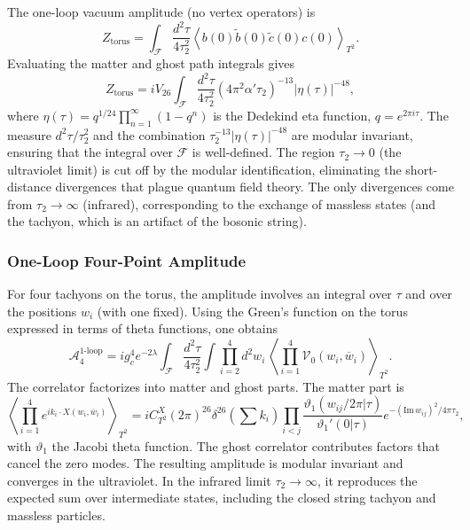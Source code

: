\documentclass[11pt]{article}
\renewcommand{\tilde}{\widetilde}
\renewcommand{\bar}{\overline}
\begin{document}
The one-loop vacuum amplitude (no vertex operators) is
\begin{equation}
Z_{\text{torus}} = \int_{\mathcal{F}} \frac{d^2\tau}{4\tau_2^2} \left\langle b(0)\tilde{b}(0)\tilde{c}(0)c(0) \right\rangle_{T^2}.
\end{equation}
Evaluating the matter and ghost path integrals gives
\begin{equation}
Z_{\text{torus}} = i V_{26} \int_{\mathcal{F}} \frac{d^2\tau}{4\tau_2^2} (4\pi^2\alpha'\tau_2)^{-13} |\eta(\tau)|^{-48},
\end{equation}
where $\eta(\tau)=q^{1/24}\prod_{n=1}^\infty (1-q^n)$ is the Dedekind eta function, $q=e^{2\pi i\tau}$. The measure $d^2\tau/\tau_2^2$ and the combination $\tau_2^{-13}|\eta(\tau)|^{-48}$ are modular invariant, ensuring that the integral over $\mathcal{F}$ is well-defined. The region $\tau_2 \to 0$ (the ultraviolet limit) is cut off by the modular identification, eliminating the short-distance divergences that plague quantum field theory. The only divergences come from $\tau_2 \to \infty$ (infrared), corresponding to the exchange of massless states (and the tachyon, which is an artifact of the bosonic string).

\subsubsection{One-Loop Four-Point Amplitude}

For four tachyons on the torus, the amplitude involves an integral over $\tau$ and over the positions $w_i$ (with one fixed). Using the Green's function on the torus expressed in terms of theta functions, one obtains
\begin{equation}
\mathcal{A}_4^{\text{1-loop}} = i g_c^4 e^{-2\lambda} \int_{\mathcal{F}} \frac{d^2\tau}{4\tau_2^2} \int \prod_{i=2}^4 d^2w_i \, \left\langle \prod_{i=1}^4 \mathcal{V}_0(w_i,\bar{w}_i) \right\rangle_{T^2}.
\end{equation}
The correlator factorizes into matter and ghost parts. The matter part is
\begin{equation}
\left\langle \prod_{i=1}^4 e^{ik_i\cdot X(w_i,\bar{w}_i)} \right\rangle_{T^2} = i C_{T^2}^X (2\pi)^{26} \delta^{26}(\sum k_i) \prod_{i<j} \frac{\vartheta_1(w_{ij}/2\pi|\tau)}{\vartheta_1'(0|\tau)} e^{-(\mathrm{Im}\,w_{ij})^2/4\pi\tau_2},
\end{equation}
with $\vartheta_1$ the Jacobi theta function. The ghost correlator contributes factors that cancel the zero modes. The resulting amplitude is modular invariant and converges in the ultraviolet. In the infrared limit $\tau_2 \to \infty$, it reproduces the expected sum over intermediate states, including the closed string tachyon and massless particles.
\end{document}
